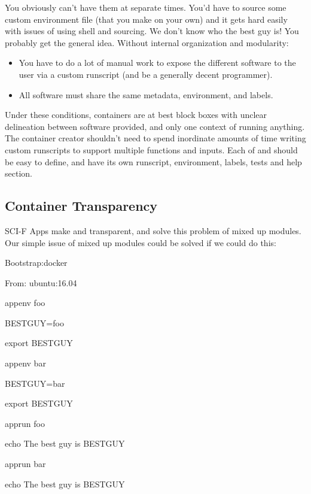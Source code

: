 \documentclass[letterpaper,10pt,english]{sphinxmanual}
\begin{document}
You obviously can’t have them at separate times. You’d have to source
some custom environment file (that you make on your own) and it gets
hard easily with issues of using shell and sourcing. We don’t know who
the best guy is! You probably get the general idea. Without internal
organization and modularity:
\begin{itemize}
\item {} 
You have to do a lot of manual work to expose the different software
to the user via a custom runscript (and be a generally decent
programmer).

\item {} 
All software must share the same metadata, environment, and labels.

\end{itemize}

Under these conditions, containers are at best block boxes with unclear
delineation between software provided, and only one context of running
anything. The container creator shouldn’t need to spend inordinate
amounts of time writing custom runscripts to support multiple functions
and inputs. Each of  and  should be easy to define, and have its own
runscript, environment, labels, tests and help section.


\subsection{Container Transparency}
\label{\detokenize{reproducible_scif_apps:container-transparency}}
SCI-F Apps make  and  transparent, and solve this problem of mixed up
modules. Our simple issue of mixed up modules could be solved if we
could do this:

%
\begin{sphinxVerbatim}[commandchars=\\\{\}]
Bootstrap:docker

From: ubuntu:16.04


\PYGZpc{}appenv foo

    BEST\PYGZus{}GUY=foo

    export BEST\PYGZus{}GUY


\PYGZpc{}appenv bar

    BEST\PYGZus{}GUY=bar

    export BEST\PYGZus{}GUY


\PYGZpc{}apprun foo

    echo The best guy is \PYGZdl{}BEST\PYGZus{}GUY


\PYGZpc{}apprun bar

    echo The best guy is \PYGZdl{}BEST\PYGZus{}GUY
\end{sphinxVerbatim}
\end{document}
